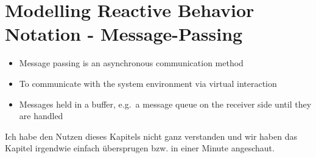 \hypertarget{modelling-reactive-behavior-notation---message-passing}{%
\section{Modelling Reactive Behavior Notation -
Message-Passing}\label{modelling-reactive-behavior-notation---message-passing}}

\begin{itemize}
\tightlist
\item
  Message passing is an asynchronous communication method
\item
  To communicate with the system environment via virtual interaction
\item
  Messages held in a buffer, e.g.~a message queue on the receiver side
  until they are handled
\end{itemize}

\begin{tcolorbox}[colback=red!5!white,colframe=red!75!black]
Ich habe den Nutzen dieses Kapitels nicht ganz verstanden und wir haben das Kapitel irgendwie einfach übersprugen bzw. in einer Minute angeschaut.
\end{tcolorbox}

\clearpage